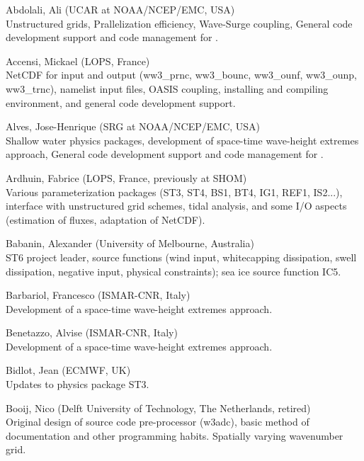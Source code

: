 \begin{list}{\ldots}{ }

\item [Abdolali, Ali] (UCAR at NOAA/NCEP/EMC, USA) \\
  Unstructured grids, Prallelization efficiency, Wave-Surge coupling, General code development support and code management for \ws.

\item [Accensi, Mickael] (LOPS, France) \\
  NetCDF for input and output (ww3\_prnc, ww3\_bounc, ww3\_ounf, ww3\_ounp, ww3\_trnc), namelist input files, OASIS coupling, installing and compiling environment, and general code development support.

\item [Alves, Jose-Henrique] (SRG at NOAA/NCEP/EMC, USA) \\
  Shallow water physics packages, development of space-time wave-height extremes approach, General code development support and code management for \ws.

\item [Ardhuin, Fabrice] (LOPS, France, previously at SHOM) \\
  Various parameterization packages (ST3, ST4, BS1, BT4, IG1, REF1, IS2...), interface with unstructured grid schemes, tidal analysis, and some I/O aspects (estimation of fluxes, adaptation of NetCDF). 

\item [Babanin, Alexander] (University of Melbourne, Australia)\\
  ST6 project leader, source functions (wind input, whitecapping dissipation, swell dissipation, negative input, physical constraints); sea ice source function IC5.

\item [Barbariol, Francesco] (ISMAR-CNR, Italy) \\
  Development of a space-time wave-height extremes approach.

\item [Benetazzo, Alvise] (ISMAR-CNR, Italy) \\
  Development of a space-time wave-height extremes approach.

\item [Bidlot, Jean] (ECMWF, UK) \\
  Updates to physics package ST3.

\item [Booij, Nico] (Delft University of Technology, The Netherlands, retired) \\
  Original design of source code pre-processor ({\code w3adc}), basic method
  of documentation and other programming habits. Spatially varying wavenumber
  grid.


\end{list}
